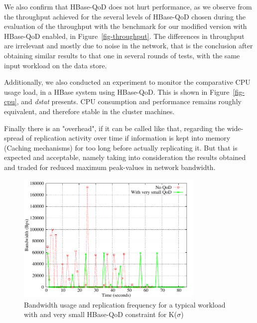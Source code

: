 We also confirm that HBase-QoD does not hurt performance, as we observe from the throughput achieved for the several levels of HBase-QoD chosen during the evaluation of the throughput with the benchmark for our modified version with HBase-QoD enabled, in Figure~\ref{fig-throughput}. The differences in throughput are irrelevant and mostly due to noise in the network, that is the conclusion after obtaining similar results to that one in several rounds of tests, with the same input workload on the data store.

Additionally, we also conducted an experiment to monitor the comparative CPU usage load, in a HBase system using HBase-QoD. This is shown in Figure~\ref{fig-cpu}, and \emph{dstat} presents. CPU consumption and performance remains roughly equivalent, and therefore stable in the cluster machines.

Finally there is an "overhead", if it can be called like that, regarding the wide-spread of replication activity over time if information is kept into memory (Caching mechanisms) for too long before actually replicating it. But that is expected and acceptable, namely taking into consideration the results obtained and traded for reduced maximum peak-values in network bandwidth.

\begin{figure}[h]
\centering
\includegraphics[width=0.8\textwidth]{figs/bandwidth.pdf}
\caption{Bandwidth usage and replication frequency for a typical workload with and very small HBase-QoD constraint for K($\sigma$)}
\label{fig-bw-freq}
\end{figure}

